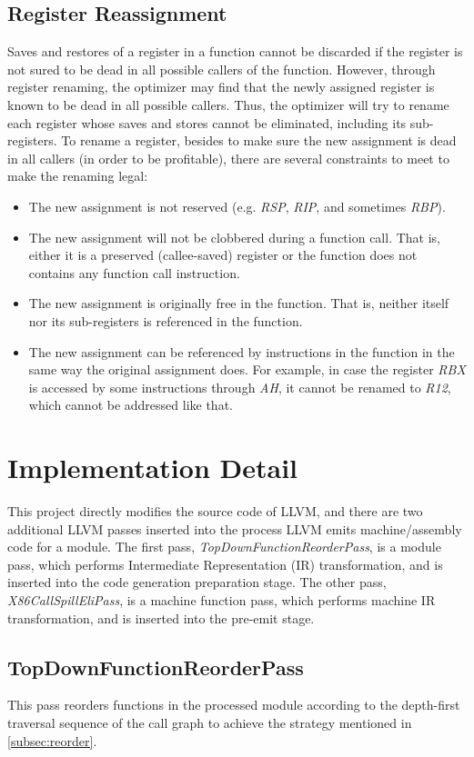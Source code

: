 \documentclass[acmsmall]{acmart}
\begin{document}
\subsection{Register Reassignment}
Saves and restores of a register in a function cannot be discarded if the register is not sured to be dead in all possible callers of the function. However, through register renaming, the optimizer may find that the newly assigned register is known to be dead in all possible callers. Thus, the optimizer will try to rename each register whose saves and stores cannot be eliminated, including its sub-registers. To rename a register, besides to make sure the new assignment is dead in all callers (in order to be profitable), there are several constraints to meet to make the renaming legal:
\begin{itemize}
	\item The new assignment is not reserved (e.g. \textit{RSP}, \textit{RIP}, and sometimes \textit{RBP}).
	\item The new assignment will not be clobbered during a function call. That is, either it is a preserved (callee-saved) register or the function does not contains any function call instruction.
	\item The new assignment is originally free in the function. That is, neither itself nor its sub-registers is referenced in the function.
	\item The new assignment can be referenced by instructions in the function in the same way the original assignment does. For example, in case the register \textit{RBX} is accessed by some instructions through \textit{AH}, it cannot be renamed to \textit{R12}, which cannot be addressed like that.
\end{itemize}


\section{Implementation Detail}
This project directly modifies the source code of LLVM, and there are two additional LLVM passes inserted into the process LLVM emits machine/assembly code for a module. The first pass, \textit{TopDownFunctionReorderPass}, is a module pass, which performs Intermediate Representation (IR) transformation, and is inserted into the code generation preparation stage. The other pass, \textit{X86CallSpillEliPass}, is a machine function pass, which performs machine IR transformation, and is inserted into the pre-emit stage.

\subsection{TopDownFunctionReorderPass}
This pass reorders functions in the processed module according to the depth-first traversal sequence of the call graph to achieve the strategy mentioned in \ref{subsec:reorder}.
\end{document}
